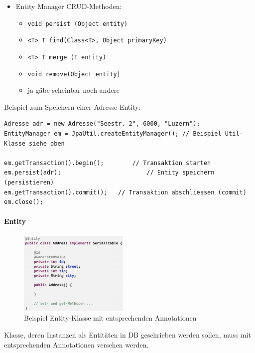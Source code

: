 \documentclass[a4paper]{article}
\begin{document}
			\begin{itemize}
				\item Entity Manager CRUD-Methoden:
					\begin{itemize}
						\item \texttt{void persist (Object entity)}
						\item \texttt{<T> T find(Class<T>, Object primaryKey)}
						\item \texttt{<T> T merge (T entity)}
						\item \texttt{void remove(Object entity)}
						\item ja gäbe scheinbar noch andere\\
					\end{itemize}
			\end{itemize}
		\noindent
		Beispiel zum Speichern einer Adresse-Entity:
		
		\begin{lstlisting}
Adresse adr = new Adresse("Seestr. 2", 6000, "Luzern");
EntityManager em = JpaUtil.createEntityManager(); // Beispiel Util-Klasse siehe oben

em.getTransaction().begin();		// Transaktion starten
em.persist(adr);						// Entity speichern (persistieren)
em.getTransaction().commit();	// Transaktion abschliessen (commit)
em.close();
		\end{lstlisting}
		
		\newpage
		
		\paragraph{Entity}
		
		\begin{figure}[!htb]
			\centering
			\includegraphics[keepaspectratio, height=4cm]{img/persistence/entity.png}
			\caption{Beispiel Entity-Klasse mit entsprechenden Annotationen}
			\label{fig:entity}
		\end{figure}
	
		Klasse, deren Instanzen als Entitäten in DB geschrieben werden sollen, muss mit entsprechenden Annotationen versehen werden.
		
\end{document}
